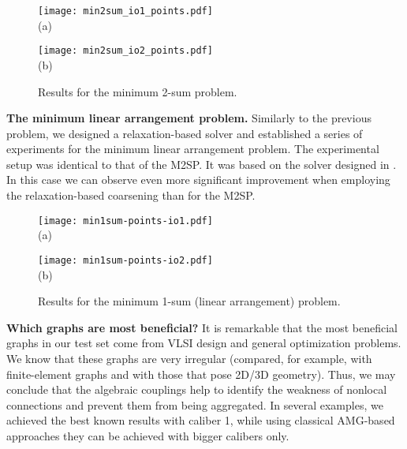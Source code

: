 \documentclass[final]{siamltex}
\begin{document}
\begin{figure}[h]
\begin{minipage}[b]{0.5\linewidth} \centering
\texttt{[image: min2sum\_io1\_points.pdf]}\\
(a) 
\end{minipage}
\hspace{0.5cm} \begin{minipage}[b]{0.5\linewidth}
\centering
\texttt{[image: min2sum\_io2\_points.pdf]}\\
(b) 
\end{minipage}
\caption{Results for the minimum 2-sum problem.}\label{fig:2sum}
\end{figure}


\par {\bf The minimum linear arrangement problem.} Similarly to the previous problem, we designed a relaxation-based solver and established a series of experiments for the minimum linear arrangement problem. The experimental setup was identical to that of the M2SP. It was based on the solver designed in \cite{safro2003}. In this case we can observe even more significant improvement when employing the relaxation-based coarsening than for the M2SP.
\begin{figure}[h]
\begin{minipage}[b]{0.5\linewidth} \centering
\texttt{[image: min1sum-points-io1.pdf]}\\
(a) 
\end{minipage}
\hspace{0.5cm} \begin{minipage}[b]{0.5\linewidth}
\centering
\texttt{[image: min1sum-points-io2.pdf]}\\
(b) 
\end{minipage}
\caption{Results for the minimum 1-sum (linear arrangement) problem.}\label{fig:1sum}
\end{figure}
\par {\bf Which graphs are most beneficial?} It is remarkable that the most beneficial graphs in our test set come from VLSI design and general optimization problems. We know that these graphs are very irregular (compared, for example,   with finite-element graphs and with those that pose 2D/3D geometry). Thus, we may conclude that the algebraic couplings help to identify the weakness of nonlocal connections and prevent them from being aggregated. In several examples, we achieved the best known results with caliber 1, while using classical AMG-based approaches they can be achieved with bigger calibers only.
\end{document}
